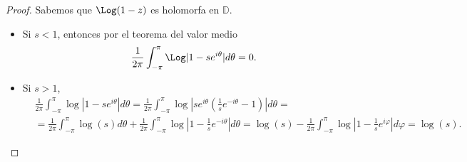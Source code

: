 \begin{proof}
    Sabemos que $\Log(1-z)$ es holomorfa en $\mathbb{D}$.
    \begin{itemize}
        \item Si $s < 1$, entonces por el teorema del valor medio
              $$\frac{1}{2\pi} \int_{-\pi}^\pi \Log|1-se^{i\theta}|d\theta = 0.$$

        \item Si $s > 1$,
              \begin{align*}
                   & \frac{1}{2\pi} \int_{-\pi}^\pi \log|1-se^{i\theta}|d\theta = \frac{1}{2\pi} \int_{-\pi}^\pi \log\left|se^{i\theta}\left(\frac{1}{s}e^{-i\theta}-1\right)\right|d\theta =                                                                    \\
                   & = \frac{1}{2\pi} \int_{-\pi}^\pi \log(s)d\theta + \frac{1}{2\pi} \int_{-\pi}^\pi \log\left|1-\frac{1}{s}e^{-i\theta}\right|d\theta = \log(s) - \frac{1}{2\pi} \int_{-\pi}^\pi \log\left|1-\frac{1}{s}e^{i\varphi}\right|d\varphi = \log(s).
              \end{align*}


\end{itemize}
\end{proof}
